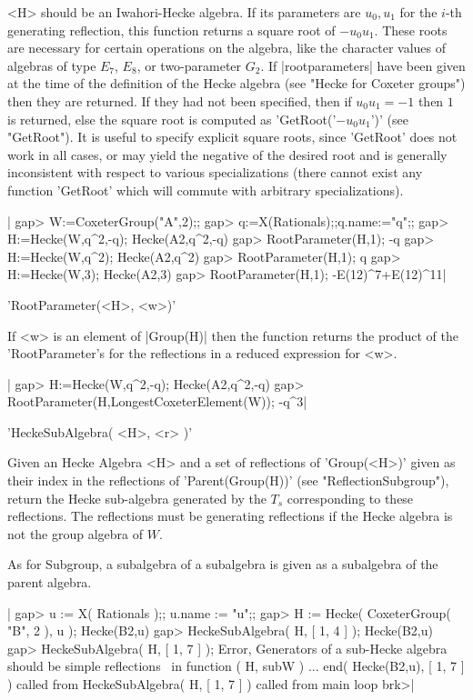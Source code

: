 <H>  should be an  Iwahori-Hecke algebra. If  its parameters are $u_0, u_1$
for  the $i$-th generating reflection, this  function returns a square root
of  $-u_0u_1$.  These  roots  are  necessary  for certain operations on the
algebra,  like the  character values  of algebras  of type $E_7$, $E_8$, or
two-parameter $G_2$. If |rootparameters| have been given at the time of the
definition  of the Hecke algebra (see "Hecke for Coxeter groups") then they
are  returned. If they had not been specified, then if $u_0u_1=-1$ then $1$
is  returned, else  the square  root is  computed as 'GetRoot('$-u_0u_1$')'
(see  "GetRoot").  It  is  useful  to  specify explicit square roots, since
'GetRoot'  does not  work in  all cases,  or may  yield the negative of the
desired  root  and  is  generally  inconsistent  with  respect  to  various
specializations  (there  cannot  exist  any  function  'GetRoot' which will
commute with arbitrary specializations).

|    gap> W:=CoxeterGroup("A",2);;
    gap> q:=X(Rationals);;q.name:="q";;
    gap> H:=Hecke(W,q^2,-q);
    Hecke(A2,q^2,-q)
    gap> RootParameter(H,1);
    -q
    gap> H:=Hecke(W,q^2);
    Hecke(A2,q^2)
    gap> RootParameter(H,1);
    q
    gap> H:=Hecke(W,3);
    Hecke(A2,3)
    gap> RootParameter(H,1);
    -E(12)^7+E(12)^11|

'RootParameter(<H>, <w>)'

If <w> is an element of |Group(H)| then the function returns the product of
the 'RootParameter's for the reflections in a reduced expression for <w>.

|    gap> H:=Hecke(W,q^2,-q);
    Hecke(A2,q^2,-q)
    gap> RootParameter(H,LongestCoxeterElement(W));
    -q^3|


'HeckeSubAlgebra( <H>, <r> )'

Given  an Hecke Algebra <H> and a  set of reflections of 'Group(<H>)' given
as   their   index   in   the   reflections   of   'Parent(Group(H))'  (see
"ReflectionSubgroup"),  return the Hecke sub-algebra generated by the $T_s$
corresponding  to  these  reflections.  The  reflections must be generating
reflections if the Hecke algebra is not the group algebra of $W$.

As for Subgroup,  a subalgebra of a subalgebra is  given as a subalgebra
of the parent algebra.

|    gap> u := X( Rationals );; u.name := "u";;
    gap> H := Hecke( CoxeterGroup( "B", 2 ), u );
    Hecke(B2,u)
    gap> HeckeSubAlgebra( H, [ 1, 4 ] );
    Hecke(B2,u)
    gap> HeckeSubAlgebra( H, [ 1, 7 ] );
    Error, Generators of a sub-Hecke algebra should be simple reflections \
    in
    function ( H, subW ) ... end( Hecke(B2,u), [ 1, 7 ] ) called from
    HeckeSubAlgebra( H, [ 1, 7 ] ) called from
    main loop
    brk>|

